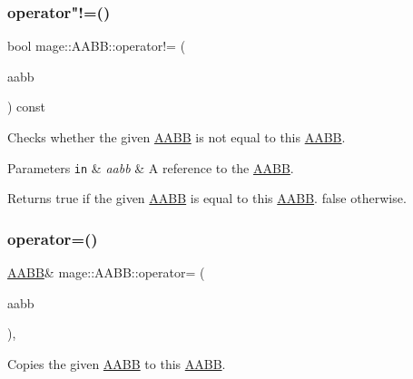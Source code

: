 \subsubsection{\texorpdfstring{operator"!=()}{operator!=()}}
{\footnotesize\ttfamily bool mage\+::\+A\+A\+B\+B\+::operator!= (\begin{DoxyParamCaption}\item[{const \hyperlink{classmage_1_1_a_a_b_b}{A\+A\+BB} \&}]{aabb }\end{DoxyParamCaption}) const\hspace{0.3cm}{\ttfamily [noexcept]}}

Checks whether the given \hyperlink{classmage_1_1_a_a_b_b}{A\+A\+BB} is not equal to this \hyperlink{classmage_1_1_a_a_b_b}{A\+A\+BB}.


\begin{DoxyParams}[1]{Parameters}
\mbox{\tt in}  & {\em aabb} & A reference to the \hyperlink{classmage_1_1_a_a_b_b}{A\+A\+BB}. \\
\hline
\end{DoxyParams}
\begin{DoxyReturn}{Returns}
{\ttfamily true} if the given \hyperlink{classmage_1_1_a_a_b_b}{A\+A\+BB} is equal to this \hyperlink{classmage_1_1_a_a_b_b}{A\+A\+BB}. {\ttfamily false} otherwise. 
\end{DoxyReturn}
\hypertarget{classmage_1_1_a_a_b_b_a11ba6858dfeaf17cc3e297385c925a8b}{}\label{classmage_1_1_a_a_b_b_a11ba6858dfeaf17cc3e297385c925a8b} 
\subsubsection{\texorpdfstring{operator=()}{operator=()}\hspace{0.1cm}{\footnotesize\ttfamily [1/2]}}
{\footnotesize\ttfamily \hyperlink{classmage_1_1_a_a_b_b}{A\+A\+BB}\& mage\+::\+A\+A\+B\+B\+::operator= (\begin{DoxyParamCaption}\item[{const \hyperlink{classmage_1_1_a_a_b_b}{A\+A\+BB} \&}]{aabb }\end{DoxyParamCaption})\hspace{0.3cm}{\ttfamily [default]}, {\ttfamily [noexcept]}}

Copies the given \hyperlink{classmage_1_1_a_a_b_b}{A\+A\+BB} to this \hyperlink{classmage_1_1_a_a_b_b}{A\+A\+BB}.


